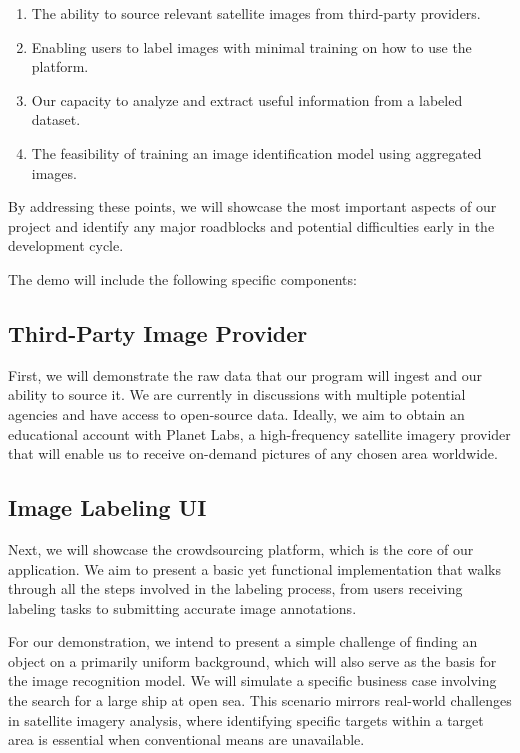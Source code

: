 \documentclass{article}
\begin{document}
\begin{enumerate} 
    \item The ability to source relevant satellite images from third-party providers. 
    \item Enabling users to label images with minimal training on how to use the platform. 
    \item Our capacity to analyze and extract useful information from a labeled dataset. 
    \item The feasibility of training an image identification model using aggregated images. 
\end{enumerate}

By addressing these points, we will showcase the most important aspects of our project and identify any major roadblocks and potential difficulties early in the development cycle.

The demo will include the following specific components:

\subsection{Third-Party Image Provider}

First, we will demonstrate the raw data that our program will ingest and our ability to source it. We are currently in discussions with multiple potential agencies and have access to open-source data. Ideally, we aim to obtain an educational account with Planet Labs, a high-frequency satellite imagery provider that will enable us to receive on-demand pictures of any chosen area worldwide.

\subsection{Image Labeling UI}

Next, we will showcase the crowdsourcing platform, which is the core of our application. We aim to present a basic yet functional implementation that walks through all the steps involved in the labeling process, from users receiving labeling tasks to submitting accurate image annotations.

For our demonstration, we intend to present a simple challenge of finding an object on a primarily uniform background, which will also serve as the basis for the image recognition model. We will simulate a specific business case involving the search for a large ship at open sea. This scenario mirrors real-world challenges in satellite imagery analysis, where identifying specific targets within a target area is essential when conventional means are unavailable.
\end{document}
